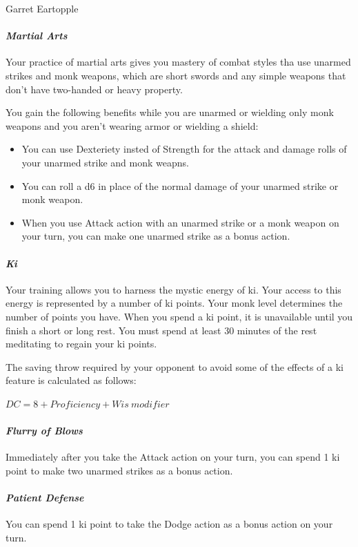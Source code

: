 \documentclass[10pt,twoside,twocolumn]{book}
\begin{document}
\begin{rpg-monsterbox}{Garret Eartopple}
   \paragraph{\emph{Martial Arts}}
   Your practice of martial arts gives you mastery of combat styles tha use unarmed strikes and monk weapons, which are short swords and any simple weapons that don't have two-handed or heavy property.

   \hskip4mm You gain the following benefits while you are unarmed or wielding only monk weapons and you aren't wearing armor or wielding a shield:
   \begin{itemize}
      \item You can use Dexteriety insted of Strength for the attack and damage rolls of your unarmed strike and monk weapns.
      \item You can roll a d6 in place of the normal damage of your unarmed strike or monk weapon.
      \item When you use Attack action with an unarmed strike or a monk weapon on your turn, you can make one unarmed strike as a bonus action.
   \end{itemize}

   \paragraph{\emph{Ki}}
   Your training allows you to harness the mystic energy of ki.
   Your access to this energy is represented by a number of ki points.
   Your monk level determines the number of points you have.
   When you spend a ki point, it is unavailable until you finish a short or long rest.
   You must spend at least 30 minutes of the rest meditating to regain your ki points.

   \hskip4mm The saving throw required by your opponent to avoid some of the effects of a ki feature is calculated as follows:
   
   $DC = 8 + Proficiency + Wis~modifier$

   \paragraph{\emph{Flurry of Blows}}
   Immediately after you take the Attack action on your turn, you can spend 1 ki point to make two unarmed strikes as a bonus action.

   \paragraph{\emph{Patient Defense}}
   You can spend 1 ki point to take the Dodge action as a bonus action on your turn.


\end{rpg-monsterbox}
\end{document}
